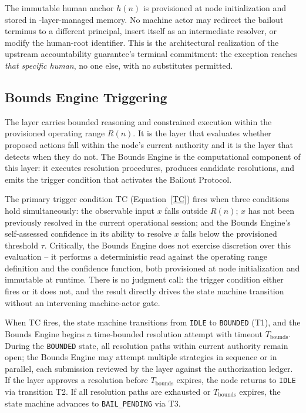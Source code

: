 The immutable human anchor $h(n)$ is provisioned at node initialization and
stored in \fact-layer-managed memory.  No machine actor may redirect the
bailout terminus to a different principal, insert itself as an intermediate
resolver, or modify the human-root identifier.  This is the architectural
realization of the upstream accountability guarantee's terminal commitment:
the exception reaches \emph{that specific human}, no one else, with no
substitutes permitted.

\subsection{Bounds Engine Triggering}\label{sec:bailout-bounds-engine}

The \bounds{} layer carries bounded reasoning and constrained execution within
the provisioned operating range $R(n)$.  It is the layer that evaluates whether
proposed actions fall within the node's current authority and it is the layer
that detects when they do not.  The Bounds Engine is the computational component
of this layer: it executes resolution procedures, produces candidate resolutions,
and emits the trigger condition that activates the Bailout Protocol.

The primary trigger condition TC (Equation~\ref{TC}) fires when three conditions
hold simultaneously: the observable input $x$ falls outside $R(n)$; $x$ has not
been previously resolved in the current operational session; and the Bounds
Engine's self-assessed confidence in its ability to resolve $x$ falls below the
provisioned threshold $\tau$.  Critically, the Bounds Engine does not exercise
discretion over this evaluation -- it performs a deterministic read against
the operating range definition and the confidence function, both provisioned at
node initialization and immutable at runtime.  There is no judgment call: the
trigger condition either fires or it does not, and the result directly drives the
state machine transition without an intervening machine-actor gate.

When TC fires, the state machine transitions from \texttt{IDLE} to
\texttt{BOUNDED} (T1), and the Bounds Engine begins a time-bounded resolution
attempt with timeout $T_{\text{bounds}}$.  During the \texttt{BOUNDED} state, all
resolution paths within current authority remain open; the Bounds Engine may
attempt multiple strategies in sequence or in parallel, each submission reviewed
by the \fact{} layer against the authorization ledger.  If the \fact{} layer
approves a resolution before $T_{\text{bounds}}$ expires, the node returns to
\texttt{IDLE} via transition T2.  If all resolution paths are exhausted or
$T_{\text{bounds}}$ expires, the state machine advances to \texttt{BAIL\_PENDING}
via T3.

